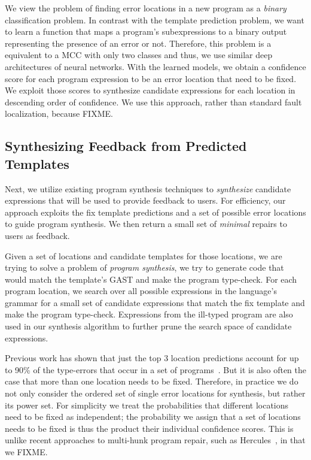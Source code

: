  We view the problem of finding error locations in a
new program as a \emph{binary} classification problem. In contrast with the
template prediction problem, we want to learn a function that maps a program's
subexpressions to a binary output representing the presence of an error or not.
Therefore, this problem is a equivalent to a MCC with only two classes and thus,
we use similar deep architectures of neural networks. With the learned models, we
obtain a confidence score for each program expression to be an error location
that need to be fixed. We exploit those scores to synthesize candidate
expressions for each location in descending order of confidence. We use
this approach, rather than standard fault localization, because FIXME. 

\subsection{Synthesizing Feedback from Predicted Templates}
\label{sec:overview:synthesis}

Next, we utilize existing program synthesis techniques to \emph{synthesize}
candidate expressions that will be used to provide feedback to users. For efficiency, our
approach exploits the fix template predictions and a set of possible error
locations to guide program synthesis. We then
return a small set of \emph{minimal} repairs to users as feedback.

 Given a set of locations and candidate templates for
those locations, we are trying to solve a problem of \emph{program synthesis},
\ie we try to generate code that would match the template's GAST and make the
program type-check. For each program location, we search over all possible
expressions in the language's grammar for a small set of candidate
expressions that match the fix template and make the program type-check.
Expressions from the ill-typed program are also used in our synthesis algorithm
to further prune the search space of candidate expressions.

 Previous work has shown that just the
top 3 location predictions account for up to 90\% of the type-errors that occur
in a set of programs~\cite{FIXME}. 
But it is also often the case that more than one location
needs to be fixed. Therefore, in practice we do not only consider the ordered set
of single error locations for synthesis, but rather its power set.
For simplicity we treat the probabilities that different locations need to be fixed
as independent; the probability we assign that a set of locations needs to be fixed
is thus the product their individual confidence scores. This is unlike
recent approaches to multi-hunk program repair, such as
Hercules~\cite{FIXME}, in that we FIXME. 

